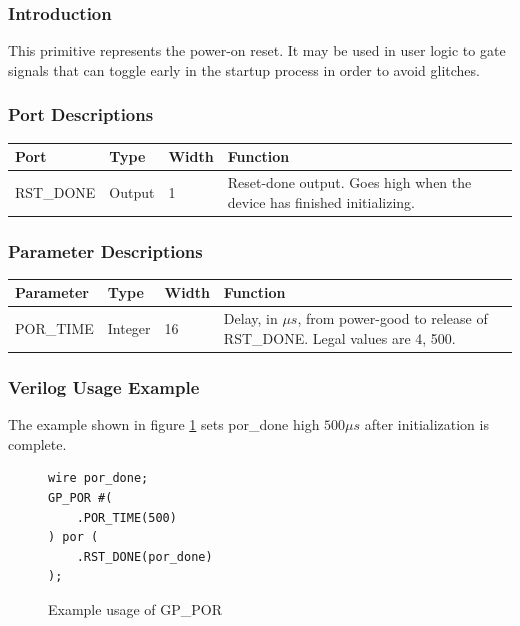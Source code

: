 \documentclass{article}
\begin{document}
\subsubsection{Introduction}
This primitive represents the power-on reset. It may be used in user logic to gate signals that can toggle early in the 
startup process in order to avoid glitches.


\subsubsection{Port Descriptions}

\begin{tabularx}{5in}{|l|l|l|X|}
\hline
{\bfseries Port} & {\bfseries Type} & {\bfseries Width} & {\bfseries Function} \\
\hline
RST\_DONE & Output & 1 & Reset-done output. Goes high when the device has finished initializing.\\
\hline
\end{tabularx}

\subsubsection{Parameter Descriptions}

\begin{tabularx}{5in}{|l|l|l|X|}
\hline
{\bfseries Parameter} & {\bfseries Type} & {\bfseries Width} & {\bfseries Function} \\
\hline
POR\_TIME & Integer & 16 & Delay, in $\mu s$, from power-good to release of RST\_DONE. Legal values are 4, 500.\\
\hline
\end{tabularx}

\subsubsection{Verilog Usage Example}

The example shown in figure \ref{gp-por-example} sets por\_done high $500 \mu s$ after initialization is complete.

\begin{figure}[h]
\begin{lstlisting}
wire por_done;
GP_POR #(
	.POR_TIME(500)
) por (
	.RST_DONE(por_done)
);
\end{lstlisting}
\caption{Example usage of GP\_POR}
\label{gp-por-example}
\end{figure}
\end{document}
